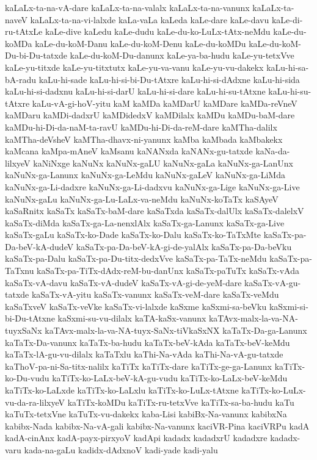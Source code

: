 {kaLaLx-ta-na-vA-dare
kaLaLx-ta-na-valalx
kaLaLx-ta-na-vanunx
kaLaLx-ta-naveV
kaLaLx-ta-na-vi-lalxde
kaLa-vaLa
kaLeda
kaLe-dare
kaLe-davu
kaLe-di-ru-tAtxLe
kaLe-dive
kaLedu
kaLe-dudu
kaLe-du-ko-LuLx-tAtx-neMdu
kaLe-du-koMDa
kaLe-du-koM-Danu
kaLe-du-koM-Denu
kaLe-du-koMDu
kaLe-du-koM-Du-bi-Du-tatxde
kaLe-du-koM-Du-danunx
kaLe-ya-ba-hudu
kaLe-yu-tetxVve
kaLe-yu-titxde
kaLe-yu-titxtutx
kaLe-yu-va-vanu
kaLe-yu-vu-dakekx
kaLu-hi-sa-bA-radu
kaLu-hi-sade
kaLu-hi-si-bi-Du-tAtxre
kaLu-hi-si-dAdxne
kaLu-hi-sida
kaLu-hi-si-dadxnu
kaLu-hi-si-darU
kaLu-hi-si-dare
kaLu-hi-su-tAtxne
kaLu-hi-su-tAtxre
kaLu-vA-gi-hoV-yitu
kaM
kaMDa
kaMDarU
kaMDare
kaMDa-reVneV
kaMDaru
kaMDi-dadxrU
kaMDidedxV
kaMDilalx
kaMDu
kaMDu-baM-dare
kaMDu-hi-Di-da-naM-ta-ravU
kaMDu-hi-Di-da-reM-dare
kaMTha-dalilx
kaMTha-deVsheV
kaMTha-dhavx-ni-yanunx
kaMba
kaMbada
kaMbakekx
kaMcana
kaMpa-mAneV
kaMsanu
kaNANxda
kaNANx-gu-tatxde
kaNa-da-lilxyeV
kaNiNxge
kaNuNx
kaNuNx-gaLU
kaNuNx-gaLa
kaNuNx-ga-LanUnx
kaNuNx-ga-Lanunx
kaNuNx-ga-LeMdu
kaNuNx-gaLeV
kaNuNx-ga-LiMda
kaNuNx-ga-Li-dadxre
kaNuNx-ga-Li-dadxvu
kaNuNx-ga-Lige
kaNuNx-ga-Live
kaNuNx-gaLu
kaNuNx-ga-Lu-LaLx-va-neMdu
kaNuNx-koTaTx
kaSAyeV
kaSaRnitx
kaSaTx
kaSaTx-baM-dare
kaSaTxda
kaSaTx-dalUlx
kaSaTx-dalelxV
kaSaTx-diMda
kaSaTx-ga-La-nenxlAlx
kaSaTx-ga-Lanunx
kaSaTx-ga-Live
kaSaTx-gaLu
kaSaTx-ko-Dade
kaSaTx-ko-Dalu
kaSaTx-ko-TaTxMte
kaSaTx-pa-Da-beV-kA-dudeV
kaSaTx-pa-Da-beV-kA-gi-de-yalAlx
kaSaTx-pa-Da-beVku
kaSaTx-pa-Dalu
kaSaTx-pa-Du-titx-dedxVve
kaSaTx-pa-TaTx-neMdu
kaSaTx-pa-TaTxnu
kaSaTx-pa-TiTx-dAdx-reM-bu-danUnx
kaSaTx-paTuTx
kaSaTx-vAda
kaSaTx-vA-davu
kaSaTx-vA-dudeV
kaSaTx-vA-gi-de-yeM-dare
kaSaTx-vA-gu-tatxde
kaSaTx-vA-yitu
kaSaTx-vanunx
kaSaTx-veM-dare
kaSaTx-veMdu
kaSaTxveV
kaSaTx-veVke
kaSaTx-vi-lalxde
kaSxme
kaSxmi-sa-beVku
kaSxmi-si-bi-Du-tAtxne
kaSxmi-su-vu-dilalx
kaTA-kaSx-vanunx
kaTAvx-malx-la-va-NA-tuyxSaNx
kaTAvx-malx-la-va-NA-tuyx-SaNx-tiVkaSxNX
kaTaTx-Da-ga-Lanunx
kaTaTx-Da-vanunx
kaTaTx-ba-hudu
kaTaTx-beV-kAda
kaTaTx-beV-keMdu
kaTaTx-lA-gu-vu-dilalx
kaTaTxlu
kaThi-Na-vAda
kaThi-Na-vA-gu-tatxde
kaThoV-pa-ni-Sa-titx-nalilx
kaTiTx
kaTiTx-dare
kaTiTx-ge-ga-Lanunx
kaTiTx-ko-Du-vudu
kaTiTx-ko-LaLx-beV-kA-gu-vudu
kaTiTx-ko-LaLx-beV-keMdu
kaTiTx-ko-LaLxde
kaTiTx-ko-LaLxlu
kaTiTx-ko-LuLx-tAtxne
kaTiTx-ko-LuLx-vu-da-ra-lilxyeV
kaTiTx-koMDu
kaTiTx-ru-tetxVve
kaTiTx-sa-ba-hudu
kaTu
kaTuTx-tetxVne
kaTuTx-vu-dakekx
kaba-Lisi
kabiBx-Na-vanunx
kabibxNa
kabibx-Nada
kabibx-Na-vA-gali
kabibx-Na-vanunx
kaciVR-Pina
kaciVRPu
kadA
kadA-cinAnx
kadA-payx-pirxyoV
kadApi
kadadx
kadadxrU
kadadxre
kadadx-varu
kada-na-gaLu
kadidx-dAdxnoV
kadi-yade
kadi-yalu
}
